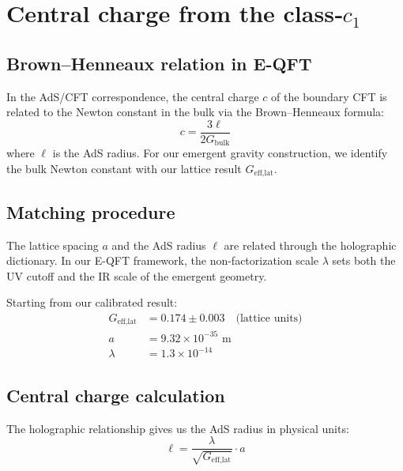 
\section{Central charge from the class‑\texorpdfstring{$c_1$}{c1}}
\label{app:central_charge}

\subsection{Brown--Henneaux relation in E-QFT}

In the AdS/CFT correspondence, the central charge $c$ of the boundary CFT is related to the Newton constant in the bulk via the Brown--Henneaux formula:
\begin{equation}
c = \frac{3\ell}{2G_{\text{bulk}}}
\end{equation}
where $\ell$ is the AdS radius. For our emergent gravity construction, we identify the bulk Newton constant with our lattice result $G_{\text{eff,lat}}$.

\subsection{Matching procedure}

The lattice spacing $a$ and the AdS radius $\ell$ are related through the holographic dictionary. In our E-QFT framework, the non-factorization scale $\lambda$ sets both the UV cutoff and the IR scale of the emergent geometry.

Starting from our calibrated result:
\begin{align}
G_{\text{eff,lat}} &= 0.174 \pm 0.003 \quad \text{(lattice units)} \\
a &= 9.32 \times 10^{-35} \text{ m} \\
\lambda &= 1.3 \times 10^{-14}
\end{align}

\subsection{Central charge calculation}

The holographic relationship gives us the AdS radius in physical units:
\begin{equation}
\ell = \frac{\lambda}{\sqrt{G_{\text{eff,lat}}}} \cdot a
\end{equation}

